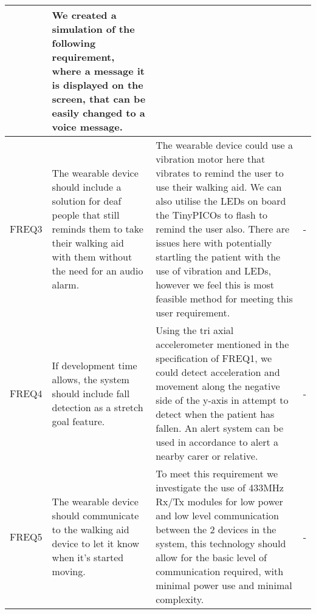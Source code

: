 \begin{xltabular}[H]{\textwidth}{c | X | X | X}
        &

        We created a simulation of the following requirement, where a message it is displayed on the screen, that can be easily changed to a voice message.\\

        \midrule

        FREQ3

        &

        The wearable device should include a solution for deaf people that still reminds them to take their walking aid with them without the need for an audio alarm.

        &

        The wearable device could use a vibration motor here that vibrates to remind the user to use their walking aid. We can also utilise the LEDs on board the TinyPICOs to flash to remind the user also. There are issues here with potentially startling the patient with the use of vibration and LEDs, however we feel this is most feasible method for meeting this user requirement.

        &

        -\\

        \midrule

        FREQ4

        &

        If development time allows, the system should include fall detection as a stretch goal feature.

        &

        Using the tri axial accelerometer mentioned in the specification of FREQ1, we could detect acceleration and movement along the negative side of the y-axis in attempt to detect when the patient has fallen. An alert system can be used in accordance to alert a nearby carer or relative.

        &

        -\\

        \midrule

        FREQ5

        &

        The wearable device should communicate to the walking aid device to let it know when it's started moving.

        &

        To meet this requirement we investigate the use of 433MHz Rx/Tx modules for low power and low level communication between the 2 devices in the system, this technology should allow for the basic level of communication required, with minimal power use and minimal complexity.

        &

        -\\

	\end{xltabular}
	\label{tbl:func_reqs_table}
